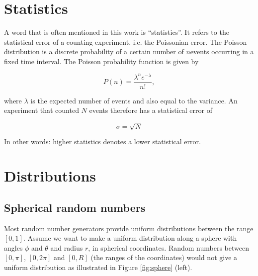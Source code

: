 \begin{appendices}

\chapter{Statistics}
A word that is often mentioned in this work is ``statistics''. It refers to the statistical error of a counting experiment, i.e. the Poissonian error. The Poisson distribution is a discrete probability of a certain number of $n$events occurring in a fixed time interval. The Poisson probability function is given by

\begin{equation}
P(n) = \frac{\lambda^n e^{-\lambda}}{n!},
\end{equation}

\noindent where $\lambda$ is the expected number of events and also equal to the variance. An experiment that counted $N$ events therefore has a statistical error of

\begin{equation}
\sigma = \sqrt{N}
\end{equation}

\noindent In other words: higher statistics denotes a lower statistical error.

\chapter{Distributions}
\label{ch:distributions}

\section{Spherical random numbers}
\label{sec:sphericalrandom}
Most random number generators provide uniform distributions between the range $[0,1]$. Assume we want to make a uniform distribution along a sphere with angles $\phi$ and $\theta$ and radius $r$, in spherical coordinates. Random numbers between $[0,\pi]$, $[0,2\pi]$ and $[0,R]$ (the ranges of the coordinates) would not give a uniform distribution as illustrated in Figure \ref{fig:sphere} (left).


\end{appendices}
